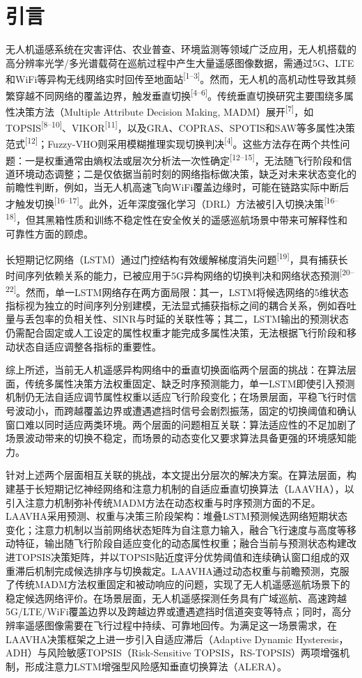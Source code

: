 \documentclass[10pt,a4paper]{ctexart}
\newcommand{\upcite}[1]{\textsuperscript{[#1]}}
\begin{document}
\setcounter{section}{-1}
\section{引言}

无人机遥感系统在灾害评估、农业普查、环境监测等领域广泛应用，无人机搭载的高分辨率光学/多光谱载荷在巡航过程中产生大量遥感图像数据，需通过5G、LTE和WiFi等异构无线网络实时回传至地面站\upcite{1--3}。然而，无人机的高机动性导致其频繁穿越不同网络的覆盖边界，触发垂直切换\upcite{4--6}。传统垂直切换研究主要围绕多属性决策方法（Multiple Attribute Decision Making, MADM）展开\upcite{7}，如TOPSIS\upcite{8--10}、VIKOR\upcite{11}，以及GRA、COPRAS、SPOTIS和SAW等多属性决策范式\upcite{12}；Fuzzy-VHO则采用模糊推理实现切换判决\upcite{4}。这些方法存在两个共性问题：一是权重通常由熵权法或层次分析法一次性确定\upcite{12--15}，无法随飞行阶段和信道环境动态调整；二是仅依据当前时刻的网络指标做决策，缺乏对未来状态变化的前瞻性判断，例如，当无人机高速飞向WiFi覆盖边缘时，可能在链路实际中断后才触发切换\upcite{16--17}。此外，近年深度强化学习（DRL）方法被引入切换决策\upcite{16--18}，但其黑箱性质和训练不稳定性在安全攸关的遥感巡航场景中带来可解释性和可靠性方面的顾虑。

长短期记忆网络（LSTM）通过门控结构有效缓解梯度消失问题\upcite{19}，具有捕获长时间序列依赖关系的能力，已被应用于5G异构网络的切换判决和网络状态预测\upcite{20--22}。然而，单一LSTM网络存在两方面局限：其一，LSTM将候选网络的5维状态指标视为独立的时间序列分别建模，无法显式捕获指标之间的耦合关系，例如吞吐量与丢包率的负相关性、SINR与时延的关联性等；其二，LSTM输出的预测状态仍需配合固定或人工设定的属性权重才能完成多属性决策，无法根据飞行阶段和移动状态自适应调整各指标的重要性。

综上所述，当前无人机遥感异构网络中的垂直切换面临两个层面的挑战：在算法层面，传统多属性决策方法权重固定、缺乏时序预测能力，单一LSTM即使引入预测机制仍无法自适应调节属性权重以适应飞行阶段变化；在场景层面，平稳飞行时信号波动小，而跨越覆盖边界或遭遇遮挡时信号会剧烈振荡，固定的切换阈值和确认窗口难以同时适应两类环境。两个层面的问题相互关联：算法适应性的不足加剧了场景波动带来的切换不稳定，而场景的动态变化又要求算法具备更强的环境感知能力。

针对上述两个层面相互关联的挑战，本文提出分层次的解决方案。在算法层面，构建基于长短期记忆神经网络和注意力机制的自适应垂直切换算法（LAAVHA），以引入注意力机制弥补传统MADM方法在动态权重与时序预测方面的不足。LAAVHA采用预测、权重与决策三阶段架构：堆叠LSTM预测候选网络短期状态变化；注意力机制以当前网络状态矩阵为自注意力输入，融合飞行速度与高度等移动特征，输出随飞行阶段自适应变化的动态属性权重；融合当前与预测状态构建改进TOPSIS决策矩阵，并以TOPSIS贴近度评分优势阈值和连续确认窗口组成的双重滞后机制完成候选排序与切换裁定。LAAVHA通过动态权重与前瞻预测，克服了传统MADM方法权重固定和被动响应的问题，实现了无人机遥感巡航场景下的稳定候选网络评价。在场景层面，无人机遥感探测任务具有广域巡航、高速跨越5G/LTE/WiFi覆盖边界以及跨越边界或遭遇遮挡时信道突变等特点；同时，高分辨率遥感图像需要在飞行过程中持续、可靠地回传。为满足这一场景需求，在LAAVHA决策框架之上进一步引入自适应滞后（Adaptive Dynamic Hysteresis，ADH）与风险敏感TOPSIS（Risk-Sensitive TOPSIS，RS-TOPSIS）两项增强机制，形成注意力LSTM增强型风险感知垂直切换算法（ALERA）。
\end{document}
